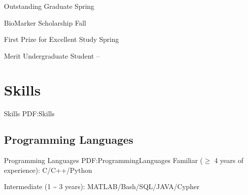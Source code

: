 \documentclass[letterpaper,10pt,oneside]{article}
\begin{document}
\begin{body}
\BulletItem
Outstanding Graduate
\hfill
Spring 

\GapNoBreak
\BulletItem
BioMarker Scholarship 
\hfill
Fall 

\GapNoBreak
\BulletItem
First Prize for Excellent Study 
\hfill
Spring 

\GapNoBreak
\BulletItem
Merit Undergraduate Student
\hfill
{} --





\iffalse
\section
{Languages}
{Languages}
{PDF:Languages}

\BulletItem
English: Native language.

\GapNoBreak
\BulletItem
Spanish: Fluent (speaking, reading, writing).

\GapNoBreak
\BulletItem
Latin: Intermediate (reading); basic (speaking, writing).
\fi

\section
{Skills}
{Skills}
{PDF:Skills}


\subsection
{Programming Languages}
{Programming Languages}
{PDF:ProgrammingLanguages}
\GapNoBreak
\BulletItem
Familiar ($\geq$ 4 years of experience): C/C++/Python

\GapNoBreak
\BulletItem
Intermediate (1 {\textasciitilde} 3 years): MATLAB/Bash/SQL/JAVA/Cypher


\end{body}
\end{document}
